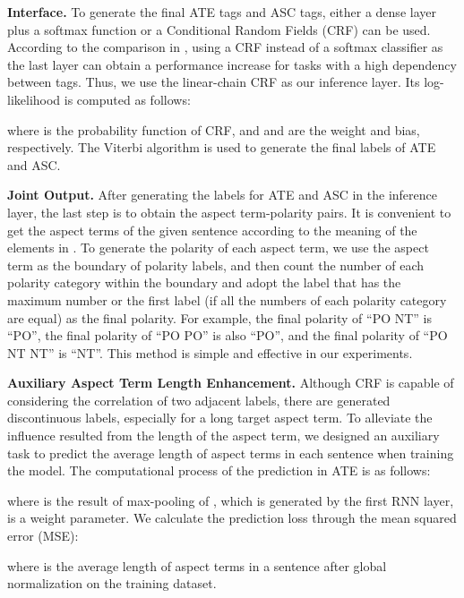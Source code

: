 \documentclass[11pt,a4paper]{article}
\begin{document}
\vspace{+1.5mm}
	\noindent
	\textbf{Interface.} \quad To generate the final ATE tags and ASC tags, either a dense layer plus a softmax function or a Conditional Random Fields (CRF) can be used. According to the comparison in \cite{Reimers2017a}, using a CRF instead of a softmax classifier as the last layer can obtain a performance increase for tasks with a high dependency between tags. Thus, we use the linear-chain CRF as our inference layer. Its log-likelihood is computed as follows:
	
	where  is the probability function of CRF, and  and  are the weight and bias, respectively. The Viterbi algorithm is used to generate the final labels of ATE and ASC.
	
	\vspace{+1.5mm}
	\noindent
	\textbf{Joint Output.} \quad After generating the labels for ATE and ASC in the inference layer, the last step is to obtain the aspect term-polarity pairs. It is convenient to get the aspect terms of the given sentence according to the meaning of the elements in . To generate the polarity of each aspect term, we use the aspect term as the boundary of polarity labels, and then count the number of each polarity category within the boundary and adopt the label that has the maximum number or the first label (if all the numbers of each polarity category are equal) as the final polarity. For example, the final polarity of ``PO NT'' is ``PO'', the final polarity of ``PO PO'' is also ``PO'', and the final polarity of ``PO NT NT'' is ``NT''. This method is simple and effective in our experiments.
	
	\vspace{+1.5mm}
	\noindent
	\textbf{Auxiliary Aspect Term Length Enhancement.} \quad Although CRF is capable of considering the correlation of two adjacent labels, there are generated discontinuous labels, especially for a long target aspect term. To alleviate the influence resulted from the length of the aspect term, we designed an auxiliary task to predict the average length of aspect terms in each sentence when training the model. The computational process of the prediction in ATE is as follows:
	
	where  is the result of max-pooling of , which is generated by the first RNN layer,  is a weight parameter. We calculate the prediction loss through the mean squared error (MSE):
	
	where  is the average length of aspect terms in a sentence after global normalization on the training dataset.
\end{document}
